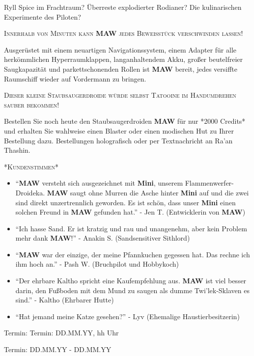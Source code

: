 \documentclass[final]{multiversum}
\begin{document}
Ryll Spice im Frachtraum?
Überreste explodierter Rodianer?
Die kulinarischen Experimente des Piloten?
\begin{center}\textsc{Innerhalb von Minuten kann \textbf{MAW} jedes Beweisstück verschwinden lassen!}\\\end{center}
Ausgerüstet mit einem neuartigen Navigationssystem, einem Adapter für alle herkömmlichen Hyperraumklappen, langanhaltendem Akku, großer beutelfreier Saugkapazität und parkettschonenden Rollen ist \textbf{MAW} bereit, jedes versiffte Raumschiff wieder auf Vordermann zu bringen.
\begin{center}\textsc{Dieser kleine Staubsaugerdroide würde selbst Tatooine im Handumdrehen sauber bekommen!}\\\end{center}
Bestellen Sie noch heute den Staubsaugerdroiden \textbf{MAW} für nur *2000 Credits* und erhalten Sie wahlweise einen Blaster oder einen modischen Hut zu Ihrer Bestellung dazu. 
Bestellungen holografisch oder per Textnachricht an Ra'an Thashin.\\
\begin{center}\textsc{*Kundenstimmen*}\\\end{center}
\begin{itemize}
\item \enquote{\textbf{MAW} versteht sich ausgezeichnet mit \textbf{Mini}, unserem Flammenwerfer-Droideka.
      \textbf{MAW} saugt ohne Murren die Asche hinter \textbf{Mini} auf und die zwei sind direkt unzertrennlich geworden. 
      Es ist schön, dass unser \textbf{Mini} einen solchen Freund in \textbf{MAW} gefunden hat.}
      - Jen T. (Entwicklerin von \textbf{MAW})
\item \enquote{Ich hasse Sand. 
      Er ist kratzig und rau und unangenehm, aber kein Problem mehr dank \textbf{MAW}!}
      - Anakin S. (Sandsensitiver Sithlord)
\item \enquote{\textbf{MAW} war der einzige, der meine Pfannkuchen gegessen hat.
      Das rechne ich ihm hoch an.}
      - Pash W. (Bruchpilot und Hobbykoch)
\item \enquote{Der ehrbare Kaltho spricht eine Kaufempfehlung aus.
      \textbf{MAW} ist viel besser darin, den Fußboden mit dem Mund zu saugen als dumme Twi'lek-Sklaven es sind.}
      - Kaltho (Ehrbarer Hutte)
\item \enquote{Hat jemand meine Katze gesehen?}
      - Lyv (Ehemalige Haustierbesitzerin)
\end{itemize}


\begin{termine}
\item Termin: Termin: DD.MM.YY, hh Uhr
  \item Termin: DD.MM.YY - DD.MM.YY
\end{termine}
\impressum
\end{document}
